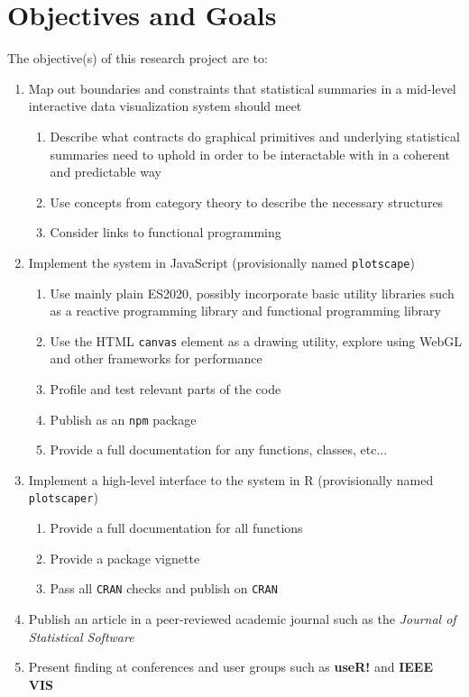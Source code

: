 \documentclass[12pt,a4paper]{article}
\begin{document}
\section{Objectives and Goals}
\label{sec:goals}


The objective(s) of this research project are to:

\begin{enumerate}

\item
Map out boundaries and constraints that statistical summaries in a mid-level interactive data visualization system should meet
  \begin{enumerate}
  \item Describe what contracts do graphical primitives and underlying statistical summaries need to uphold in order to be interactable with in a coherent and predictable way
  \item Use concepts from category theory to describe the necessary structures
  \item Consider links to functional programming  
  \end{enumerate}

\item Implement the system in JavaScript (provisionally named \texttt{plotscape})
  \begin{enumerate}
  \item Use mainly plain ES2020, possibly incorporate basic utility libraries such as a reactive programming library and functional programming library
  \item Use the HTML \texttt{canvas} element as a drawing utility, explore using WebGL and other frameworks for performance
  \item Profile and test relevant parts of the code
  \item Publish as an \texttt{npm} package
  \item Provide a full documentation for any functions, classes, etc...
  \end{enumerate}

\item Implement a high-level interface to the system in R (provisionally named \texttt{plotscaper})
  \begin{enumerate}
  \item Provide a full documentation for all functions
  \item Provide a package vignette
  \item Pass all \texttt{CRAN} checks and publish on \texttt{CRAN} 
  \end{enumerate}
  
\item Publish an article in a peer-reviewed academic journal such as the \textit{Journal of Statistical Software}

\item Present finding at conferences and user groups such as \textbf{useR!} and \textbf{IEEE VIS}

\end{enumerate}
\end{document}
